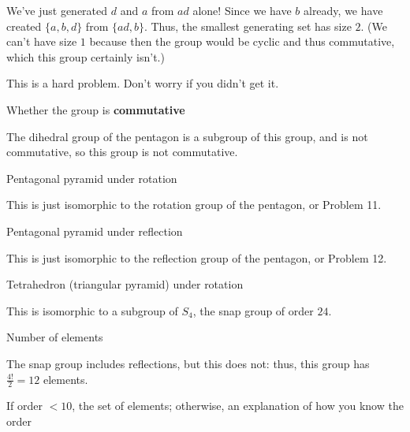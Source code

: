 \documentclass[../gatm_answers.tex]{subfiles}
\begin{document}
We've just generated $d$ and $a$ from $ad$ alone! Since we have $b$ already, we have created $\{a,b,d\}$ from $\{ad,b\}$. Thus, the smallest generating set has size $2$. (We can't have size $1$ because then the group would be cyclic and thus commutative, which this group certainly isn't.)

This is a hard problem. Don't worry if you didn't get it.

\begin{inner_problem}
\item Whether the group is \textbf{commutative}
\end{inner_problem}

The dihedral group of the pentagon is a subgroup of this group, and is not commutative, so this group is not commutative.

\begin{outer_problem}
\item Pentagonal pyramid under rotation
\end{outer_problem}

This is just isomorphic to the rotation group of the pentagon, or Problem 11.

\begin{outer_problem}
\item Pentagonal pyramid under reflection
\end{outer_problem}

This is just isomorphic to the reflection group of the pentagon, or Problem 12.

\begin{outer_problem}
\item Tetrahedron (triangular pyramid) under rotation
\end{outer_problem}

This is isomorphic to a subgroup of $S_4$, the snap group of order $24$.

\begin{inner_problem}[start=1]
\item Number of elements
\end{inner_problem}

The snap group includes reflections, but this does not: thus, this group has $\frac{4!}{2}=12$ elements.

\begin{inner_problem}
\item If order $< 10$, the set of elements; otherwise, an explanation of how you know the order
\end{inner_problem}
\end{document}
